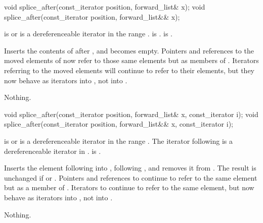 %
\begin{itemdecl}
void splice_after(const_iterator position, forward_list& x);
void splice_after(const_iterator position, forward_list&& x);
\end{itemdecl}

\begin{itemdescr}
\pnum
\expects
{} is  or is a dereferenceable
iterator in the range .
 is .
 is .

\pnum
\effects
Inserts the contents of  after
, and  becomes empty. Pointers and references to the moved
elements of  now refer to those same elements but as members of .
Iterators referring to the moved elements will continue to refer to their elements, but
they now behave as iterators into , not into .

\pnum
\throws
Nothing.

\pnum
\complexity
{}
\end{itemdescr}

%
\begin{itemdecl}
void splice_after(const_iterator position, forward_list& x, const_iterator i);
void splice_after(const_iterator position, forward_list&& x, const_iterator i);
\end{itemdecl}

\begin{itemdescr}
\pnum
\expects
{} is  or is a dereferenceable
iterator in the range .
The iterator following  is a dereferenceable iterator in .
 is .

\pnum
\effects
Inserts the element following  into , following
, and removes it from .
The result is unchanged if  or . Pointers
and references to  continue to refer to the same element but as a member of
. Iterators to  continue to refer to
the same element, but now behave as iterators into , not into .

\pnum
\throws
Nothing.

\pnum
\complexity
{}
\end{itemdescr}

